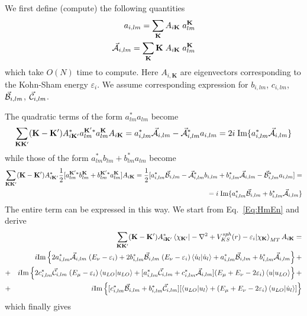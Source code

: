 \documentclass[aps,prb,floatfix,epsfig,singlecolumn,showpacs,preprintnumbers]{revtex4}
\newcommand{\vK}{{\mathbf{K}}}
\renewcommand{\Im}{\textrm{Im}}
\newcommand{\vcA}{\vec{\cal A}}
\newcommand{\vcB}{\vec{\cal B}}
\newcommand{\vcC}{\vec{\cal C}}
\begin{document}
We first define (compute) the following quantities
\begin{eqnarray}
a_{i,lm}=\sum_\vK A_{i\vK} \; a_{lm}^\vK\\
\vcA_{i,lm}=\sum_\vK \vK \; A_{i\vK} \; a_{lm}^\vK 
\end{eqnarray}
which take $O(N)$ time to compute. Here $A_{i,\vK}$ are eigenvectors corresponding to the Kohn-Sham
energy $\varepsilon_i$. We assume corresponding expression for $b_{i,lm}$,
$c_{i,lm}$, $\vcB_{i,lm}$, $\vcC_{i,lm}$.

The quadratic terms of the form $a^*_{lm} a_{lm}$ become
\begin{eqnarray}
\sum_{\vK\vK'} (\vK-\vK') A_{i\vK'}^*  a^{\vK' *}_{lm}  a_{lm}^{\vK}  A_{i\vK} = 
a_{i,lm}^* \vcA_{i,lm} - \vcA^*_{i,lm}  a_{i,lm} = 
2i\; \Im\{ a_{i,lm}^* \vcA_{i,lm} \}
\end{eqnarray}
while those of the form $a^*_{lm}b_{lm}+b^*_{lm} a_{lm}$ become
\begin{eqnarray}
\sum_{\vK\vK'} (\vK-\vK') A_{i\vK'}^*  \frac{1}{2}[a^{\vK' *}_{lm}  b_{lm}^{\vK} + b^{\vK' *}_{lm}  a_{lm}^{\vK} ]A_{i\vK} = 
\frac{1}{2} [a_{i,lm}^* \vcB_{i,lm} - \vcA^*_{i,lm} b_{i,lm} +
  b^*_{i,lm} \vcA_{i,lm} - \vcB^*_{i,lm} a_{i,lm}]= \nonumber\\
=i\; \Im\{ a_{i,lm}^* \vcB_{i,lm} + b_{i,lm}^* \vcA_{i,lm}  \}
\end{eqnarray}
The entire term can be expressed in this way. We start from
Eq.~\ref{Eq:HmEn} and derive
\begin{eqnarray}
&& \sum_{\vK\vK'} (\vK-\vK')  A^*_{i\vK'}\braket{\chi_{\vK'}|-\nabla^2+V_{KS}^{sph}(r)-\varepsilon_i|\chi_\vK}_{MT}A_{i\vK}=
\nonumber\\
&& i\Im\left\{
2 a_{i,lm}^* \vcA_{i,lm} \; (E_\nu-\varepsilon_i)  + 
2  b_{i,lm}^* \vcB_{i,lm} \; (E_\nu-\varepsilon_i)\braket{\dot{u}_l|\dot{u}_l} +
 a_{i,lm}^* \vcB_{i,lm} + b_{i,lm}^* \vcA_{i,lm} 
\right\}+
%
\nonumber\\
&+& i\Im\left\{
2 c^*_{i,lm}  \vcC_{i,lm} \; (E_{\mu}-\varepsilon_i) \braket{u_{LO}|u_{LO}}+
[a^*_{i,lm} \vcC_{i,lm} + c^*_{i,lm} \vcA_{i,lm} ]  (E_{\mu}+E_\nu-2\varepsilon_i)\braket{u|u_{LO}}
\right\}+
\nonumber\\
&+& i\Im\left\{
[c^*_{i,lm}  \vcB_{i,lm} + b^*_{i,lm}  \vcC_{i,lm} ][ \braket{u_{LO}|u_l}  + (E_\mu+E_\nu-2\varepsilon_i)\braket{u_{LO}|\dot{u}_l} ]
\right\}
\end{eqnarray}
which finally gives
\end{document}
